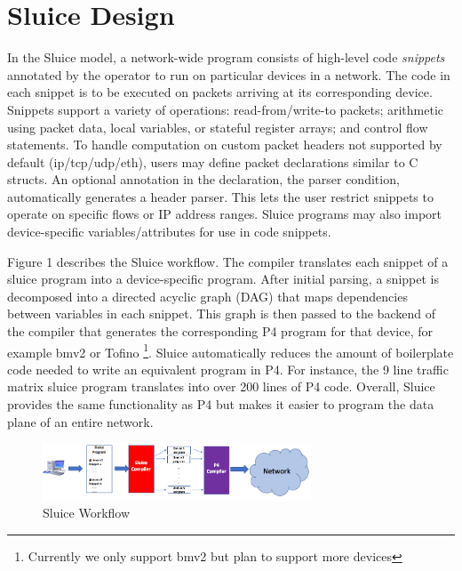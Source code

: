 \section{Sluice Design}
In the Sluice model, a network-wide program consists of high-level code
\textit{snippets} annotated by the operator to run on particular devices in a
network. The code in each snippet is to be executed on packets arriving at its
corresponding device. Snippets support a variety of operations:
read-from/write-to packets; arithmetic using packet data, local variables, or
stateful register arrays; and control flow statements. To handle computation on
custom packet headers not supported by default (ip/tcp/udp/eth), users may
define packet declarations similar to C structs. An optional annotation in the
declaration, the parser condition, automatically generates a header parser.
This lets the user restrict snippets to operate on specific flows or IP address
ranges. Sluice programs may also import device-specific variables/attributes
for use in code snippets.

Figure 1 describes the Sluice workflow. The compiler translates each snippet of
a sluice program into a device-specific program. After initial parsing, a
snippet is decomposed into a directed acyclic graph (DAG) that maps
dependencies between variables in each snippet. This graph is then passed to
the backend of the compiler that generates the corresponding P4 program for
that device, for example bmv2 or Tofino \footnote{Currently we only support
bmv2 but plan to support more devices}. Sluice automatically reduces the amount
of boilerplate code needed to write an equivalent program in P4. For instance,
the 9 line traffic matrix sluice program translates into over 200 lines of P4
code. Overall, Sluice provides the same functionality as P4 but makes it easier
to program the data plane of an entire network. 

\begin{figure}[tp]
\centering
\includegraphics[width=80mm,scale=0.7]{figures/sluice_workflow.png}
\caption{Sluice Workflow}
\end{figure}






